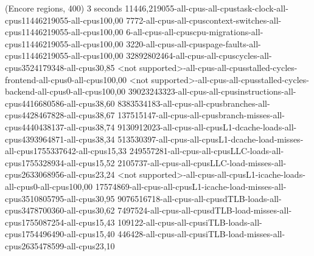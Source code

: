 (Encore regions, 400)
3 seconds
11446,219055-all-cpus-all-cpustask-clock-all-cpus11446219055-all-cpus100,00
7772-all-cpus-all-cpuscontext-switches-all-cpus11446219055-all-cpus100,00
6-all-cpus-all-cpuscpu-migrations-all-cpus11446219055-all-cpus100,00
3220-all-cpus-all-cpuspage-faults-all-cpus11446219055-all-cpus100,00
32892802464-all-cpus-all-cpuscycles-all-cpus3524179348-all-cpus30,85
<not supported>-all-cpus-all-cpusstalled-cycles-frontend-all-cpus0-all-cpus100,00
<not supported>-all-cpus-all-cpusstalled-cycles-backend-all-cpus0-all-cpus100,00
39023243323-all-cpus-all-cpusinstructions-all-cpus4416680586-all-cpus38,60
8383534183-all-cpus-all-cpusbranches-all-cpus4428467828-all-cpus38,67
137515147-all-cpus-all-cpusbranch-misses-all-cpus4440438137-all-cpus38,74
9130912023-all-cpus-all-cpusL1-dcache-loads-all-cpus4393964871-all-cpus38,34
513530397-all-cpus-all-cpusL1-dcache-load-misses-all-cpus1755337642-all-cpus15,33
249557281-all-cpus-all-cpusLLC-loads-all-cpus1755328934-all-cpus15,52
2105737-all-cpus-all-cpusLLC-load-misses-all-cpus2633068956-all-cpus23,24
<not supported>-all-cpus-all-cpusL1-icache-loads-all-cpus0-all-cpus100,00
17574869-all-cpus-all-cpusL1-icache-load-misses-all-cpus3510805795-all-cpus30,95
9076516718-all-cpus-all-cpusdTLB-loads-all-cpus3478700360-all-cpus30,62
7497524-all-cpus-all-cpusdTLB-load-misses-all-cpus1755087254-all-cpus15,43
109122-all-cpus-all-cpusiTLB-loads-all-cpus1754496490-all-cpus15,40
446428-all-cpus-all-cpusiTLB-load-misses-all-cpus2635478599-all-cpus23,10
